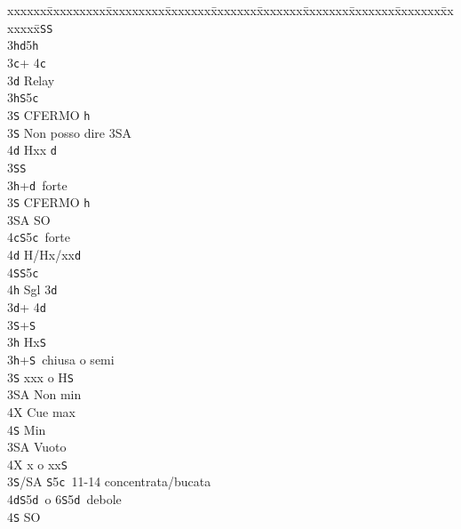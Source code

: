 \documentclass[a4paper,italian]{article}
\newcommand{\BS}{\small{\texttt{S}}}
\newcommand{\BC}{\small{\texttt{c}}}
\newcommand{\BD}{\small{\texttt{d}}}
\newcommand{\BH}{\small{\texttt{h}}}
\newenvironment{bidtable}
{\begin{tabbing}

    xxxxxx\=xxxxxxxxx\=xxxxxxxxx\=xxxxxxx\=xxxxxxx\=xxxxxxx\=xxxxxxx\=xxxxxxx\=xxxxxxx\=xxxxxxx\=\kill}
{\end{tabbing} }%
\begin{document}
\begin{multicols}{2}
\begin{bidtable}
        3\BS {}\BS \\
        3\BH {}\BD 5\BH\-\\
        3\BC {}+ 4\BC \+\\
        3\BD \> Relay\+\\
        3\BH {}\BS 5\BC \+\\
        3\BS \> CFERMO \BH\-\\
        3\BS \> Non posso dire 3\small{SA}\\
        4\BD \> Hxx \BD \-\\
        3\BS {}\BS \\
        3\BH {}+\BD\ forte\+\\
        3\BS\> CFERMO \BH\\
        3\small{SA} \> SO\\
        4\BC {}\BS 5\BC\ forte\\
        4\BD \> H/Hx/xx\BD \\
        4\BS {}\BS 5\BC \\
        4\BH \> Sgl 3\BD \-\-\\
        3\BD {}+ 4\BD \+\\
        3\BS {}+\BS \\
        3\BH \> Hx\BS \-\\
        3\BH {}+\BS\ chiusa o semi\+\\
        3\BS \> xxx o H\BS \+\\
        3\small{SA} \> Non min\\
        4X \> Cue max\\
        4\BS\> Min\-\\
        3\small{SA} \> Vuoto\\
        4X \> x o xx\BS \-\\
        3\BS/SA \BS 5\BC\ 11-14 concentrata/bucata\\
        4\BD {}\BS5\BD\ o 6\BS5\BD\ debole\+\\
        4\BS \> SO
    \end{bidtable}
\end{multicols}

\newpage
\end{document}
